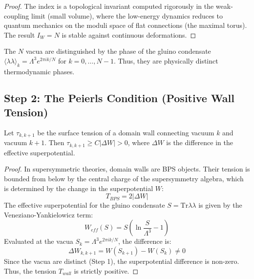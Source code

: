 \begin{proof}
The index is a topological invariant computed rigorously in the weak-coupling limit (small volume), where the low-energy dynamics reduces to quantum mechanics on the moduli space of flat connections (the maximal torus). The result $I_W=N$ is stable against continuous deformations.
\end{proof}

\begin{lemma}
The $N$ vacua are distinguished by the phase of the gluino condensate $\langle \lambda \lambda \rangle_k = \Lambda^3 e^{2\pi i k/N}$ for $k=0, \dots, N-1$. Thus, they are physically distinct thermodynamic phases.
\end{lemma}

\subsection{Step 2: The Peierls Condition (Positive Wall Tension)}
\begin{theorem}
\label{thm:peierls-condition}
Let $\tau_{k,k+1}$ be the surface tension of a domain wall connecting vacuum $k$ and vacuum $k+1$. Then $\tau_{k,k+1} \ge C |\Delta W| > 0$, where $\Delta W$ is the difference in the effective superpotential.
\end{theorem}

\begin{proof}
In supersymmetric theories, domain walls are BPS objects. Their tension is bounded from below by the central charge of the supersymmetry algebra, which is determined by the change in the superpotential $W$:
\begin{equation}
T_{BPS} = 2 | \Delta W |
\end{equation}
The effective superpotential for the gluino condensate $S = \text{Tr} \lambda \lambda$ is given by the Veneziano-Yankielowicz term:
\begin{equation}
W_{eff}(S) = S \left( \ln \frac{S}{\Lambda^3} - 1 \right)
\end{equation}
Evaluated at the vacua $S_k = \Lambda^3 e^{2\pi i k/N}$, the difference is:
\begin{equation}
\Delta W_{k, k+1} = W(S_{k+1}) - W(S_k) \neq 0
\end{equation}
Since the vacua are distinct (Step 1), the superpotential difference is non-zero. Thus, the tension $T_{wall}$ is strictly positive.
\end{proof}


